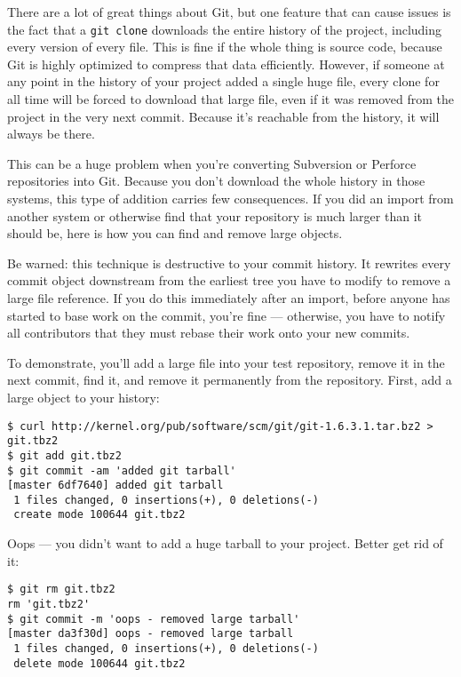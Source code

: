 \documentclass[a4paper]{book}
\begin{document}
There are a lot of great things about Git, but one feature that can cause issues is the fact that a \texttt{git clone} downloads the entire history of the project, including every version of every file. This is fine if the whole thing is source code, because Git is highly optimized to compress that data efficiently. However, if someone at any point in the history of your project added a single huge file, every clone for all time will be forced to download that large file, even if it was removed from the project in the very next commit. Because it's reachable from the history, it will always be there.

This can be a huge problem when you're converting Subversion or Perforce repositories into Git. Because you don't download the whole history in those systems, this type of addition carries few consequences. If you did an import from another system or otherwise find that your repository is much larger than it should be, here is how you can find and remove large objects.

Be warned: this technique is destructive to your commit history. It rewrites every commit object downstream from the earliest tree you have to modify to remove a large file reference. If you do this immediately after an import, before anyone has started to base work on the commit, you're fine --- otherwise, you have to notify all contributors that they must rebase their work onto your new commits.

To demonstrate, you'll add a large file into your test repository, remove it in the next commit, find it, and remove it permanently from the repository. First, add a large object to your history:

\begin{shaded}\begin{verbatim}
$ curl http://kernel.org/pub/software/scm/git/git-1.6.3.1.tar.bz2 > git.tbz2
$ git add git.tbz2
$ git commit -am 'added git tarball'
[master 6df7640] added git tarball
 1 files changed, 0 insertions(+), 0 deletions(-)
 create mode 100644 git.tbz2
\end{verbatim}\end{shaded}

Oops --- you didn't want to add a huge tarball to your project. Better get rid of it:

\begin{shaded}\begin{verbatim}
$ git rm git.tbz2
rm 'git.tbz2'
$ git commit -m 'oops - removed large tarball'
[master da3f30d] oops - removed large tarball
 1 files changed, 0 insertions(+), 0 deletions(-)
 delete mode 100644 git.tbz2
\end{verbatim}\end{shaded}
\end{document}
